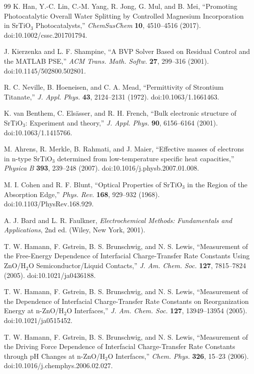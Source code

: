 \documentclass[11pt]{article}
\begin{document}
\begin{thebibliography}{99}
K. Han, Y.-C. Lin, C.-M. Yang, R. Jong, G. Mul, and B. Mei,
``Promoting Photocatalytic Overall Water Splitting by Controlled Magnesium Incorporation in SrTiO$_3$ Photocatalysts,''
\textit{ChemSusChem} \textbf{10}, 4510--4516 (2017). doi:10.1002/cssc.201701794.

J. Kierzenka and L. F. Shampine,
``A BVP Solver Based on Residual Control and the MATLAB PSE,''
\textit{ACM Trans. Math. Softw.} \textbf{27}, 299--316 (2001). doi:10.1145/502800.502801.

R. C. Neville, B. Hoeneisen, and C. A. Mead,
``Permittivity of Strontium Titanate,''
\textit{J. Appl. Phys.} \textbf{43}, 2124--2131 (1972). doi:10.1063/1.1661463.

K. van Benthem, C. Els\"asser, and R. H. French,
``Bulk electronic structure of SrTiO$_3$: Experiment and theory,''
\textit{J. Appl. Phys.} \textbf{90}, 6156--6164 (2001). doi:10.1063/1.1415766.

M. Ahrens, R. Merkle, B. Rahmati, and J. Maier,
``Effective masses of electrons in n-type SrTiO$_3$ determined from low-temperature specific heat capacities,''
\textit{Physica B} \textbf{393}, 239--248 (2007). doi:10.1016/j.physb.2007.01.008.

M. I. Cohen and R. F. Blunt,
``Optical Properties of SrTiO$_3$ in the Region of the Absorption Edge,''
\textit{Phys. Rev.} \textbf{168}, 929--932 (1968). doi:10.1103/PhysRev.168.929.

A. J. Bard and L. R. Faulkner,
\textit{Electrochemical Methods: Fundamentals and Applications}, 2nd ed. (Wiley, New York, 2001).


T. W. Hamann, F. Gstrein, B. S. Brunschwig, and N. S. Lewis,
``Measurement of the Free-Energy Dependence of Interfacial Charge-Transfer Rate Constants Using ZnO/H$_2$O Semiconductor/Liquid Contacts,''
\textit{J. Am. Chem. Soc.} \textbf{127}, 7815--7824 (2005). doi:10.1021/ja0436188.

T. W. Hamann, F. Gstrein, B. S. Brunschwig, and N. S. Lewis,
``Measurement of the Dependence of Interfacial Charge-Transfer Rate Constants on Reorganization Energy at n-ZnO/H$_2$O Interfaces,''
\textit{J. Am. Chem. Soc.} \textbf{127}, 13949--13954 (2005). doi:10.1021/ja0515452.

T. W. Hamann, F. Gstrein, B. S. Brunschwig, and N. S. Lewis,
``Measurement of the Driving Force Dependence of Interfacial Charge-Transfer Rate Constants through pH Changes at n-ZnO/H$_2$O Interfaces,''
\textit{Chem. Phys.} \textbf{326}, 15--23 (2006). doi:10.1016/j.chemphys.2006.02.027.

\end{thebibliography}
\end{document}
